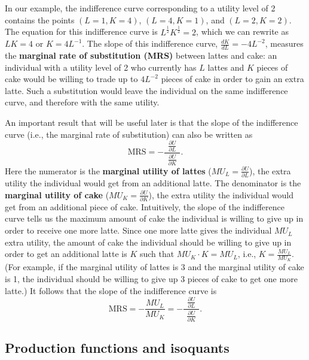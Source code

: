 In our example, the indifference curve corresponding to a utility level of 2 contains the points $(L=1, K=4)$, $(L=4, K=1)$, and $(L=2, K=2)$. The equation for this indifference curve is $L^{\frac{1}{2}}K^{\frac{1}{2}}=2$, which we can rewrite as $LK=4$ or $K=4L^{-1}$. The slope of this indifference curve, $\displaystyle\frac{dK}{dL}=-4L^{-2}$, measures the \textbf{marginal rate of substitution (MRS)} between lattes and cake: an individual with a utility level of 2 who currently has $L$ lattes and $K$ pieces of cake would be willing to trade up to $4L^{-2}$ pieces of cake in order to gain an extra latte. Such a substitution would leave the individual on the same indifference curve, and therefore with the same utility.

An important result that will be useful later is that the slope of the indifference curve (i.e., the marginal rate of substitution) can also be written as
\[
\mbox{MRS}=-\frac{\ \ \frac{\partial U}{\partial L}\ \
}{\frac{\partial U}{\partial K}}.
\]
Here the numerator is the \textbf{marginal utility of lattes} ($MU_L=\displaystyle\frac{\partial U}{\partial L}$), the extra utility the individual would get from an additional latte. The denominator is the \textbf{marginal utility of cake} ($MU_K=\displaystyle\frac{\partial U}{\partial K}$), the extra utility the individual would get from an additional piece of cake. Intuitively, the slope of the indifference curve tells us the maximum amount of cake the individual is willing to give up in order to receive one more latte. Since one more latte gives the individual $MU_L$ extra utility, the amount of cake the individual should be willing to give up in order to get an additional latte is $K$ such that $MU_K\cdot K=MU_L$, i.e., $K=\displaystyle\frac{MU_L}{MU_K}$. (For example, if the marginal utility of lattes is 3 and the marginal utility of cake is 1, the individual should be willing to give up 3 pieces of cake to get one more latte.) It follows that the slope of the indifference curve is
\[
\mbox{MRS}=-\frac{MU_L}{MU_K}=-\frac{\ \ \frac{\partial
U}{\partial L}\ \ }{\frac{\partial U}{\partial K}}.
\]



\subsection*{Production functions and isoquants}

